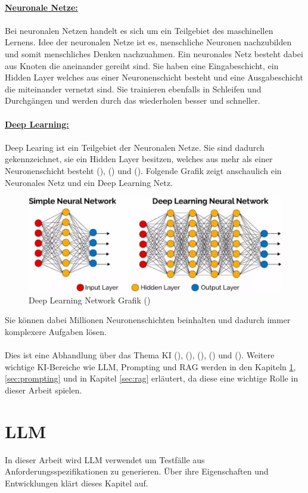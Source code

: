\documentclass[12pt,toc=bib,toc=listof]{scrreprt}
\begin{document}
\\
\textbf{\underline{Neuronale Netze:}}\\
\\
Bei neuronalen Netzen handelt es sich um ein Teilgebiet des maschinellen Lernens. Idee der neuronalen Netze ist es, menschliche Neuronen nachzubilden und somit menschliches Denken nachzuahmen. Ein neuronales Netz besteht dabei aus Knoten die aneinander gereiht sind. Sie haben eine Eingabeschicht, ein Hidden Layer welches aus einer Neuronenschicht besteht und eine Ausgabeschicht die miteinander vernetzt sind. Sie trainieren ebenfalls in Schleifen und Durchgängen und werden durch das wiederholen besser und schneller.\\
\\
\textbf{\underline{Deep Learning:}}\\
\\
Deep Learing ist ein Teilgebiet der Neuronalen Netze. Sie sind dadurch gekennzeichnet, sie ein Hidden Layer besitzen, welches aus mehr als einer Neuronenschicht besteht (\cite{Bhatt2021}), (\cite{Dymatrix2018}) und (\cite{Zhu2021}). Folgende Grafik zeigt anschaulich ein Neuronales Netz und ein Deep Learning Netz.
\begin{figure} [H]
    \centering
    \includegraphics[width=0.75\linewidth]{./Bilder/Dymatrix_Deep_Learning_Networks.jpg}
    \caption{Deep Learning Network Grafik (\cite{Dymatrix2018})}
    \label{fig:enter-label}
\end{figure}
\noindent Sie können dabei Millionen Neuronenschichten beinhalten und dadurch immer komplexere Aufgaben lösen.\\
\\
Dies ist eine Abhandlung über das Thema KI (\cite{Bhatt2021}), (\cite{Hecker2018}), (\cite{Mocko2021}), (\cite{Roscher2025}) und (\cite{Zhu2021}). Weitere wichtige KI-Bereiche wie LLM, Prompting und RAG werden in den Kapiteln \ref{sec:llm}, \ref{sec:prompting} und in Kapitel \ref{sec:rag} erläutert, da diese eine wichtige Rolle in dieser Arbeit spielen.

\section{LLM} %
\label{sec:llm}
In dieser Arbeit wird LLM verwendet um Testfälle aus Anforderungsspezifikationen zu generieren. Über ihre Eigenschaften und Entwicklungen klärt dieses Kapitel auf.
\end{document}
